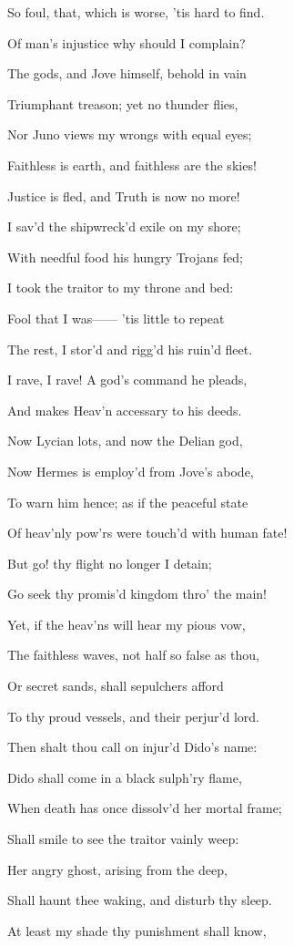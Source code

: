 So foul, that, which is worse, ’tis hard to find.

Of man’s injustice why should I complain?

The gods, and Jove himself, behold in vain

Triumphant treason; yet no thunder flies,

Nor Juno views my wrongs with equal eyes;

Faithless is earth, and faithless are the skies!

Justice is fled, and Truth is now no more!

I sav’d the shipwreck’d exile on my shore;

With needful food his hungry Trojans fed;

I took the traitor to my throne and bed:

Fool that I was—— ’tis little to repeat

The rest, I stor’d and rigg’d his ruin’d fleet.

I rave, I rave! A god’s command he pleads,

And makes Heav’n accessary to his deeds.

Now Lycian lots, and now the Delian god,

Now Hermes is employ’d from Jove’s abode,

To warn him hence; as if the peaceful state

Of heav’nly pow’rs were touch’d with human fate!

But go! thy flight no longer I detain;

Go seek thy promis’d kingdom thro’ the main!

Yet, if the heav’ns will hear my pious vow,

The faithless waves, not half so false as thou,

Or secret sands, shall sepulchers afford

To thy proud vessels, and their perjur’d lord.

Then shalt thou call on injur’d Dido’s name:

Dido shall come in a black sulph’ry flame,

When death has once dissolv’d her mortal frame;

Shall smile to see the traitor vainly weep:

Her angry ghost, arising from the deep,

Shall haunt thee waking, and disturb thy sleep.

At least my shade thy punishment shall know,


